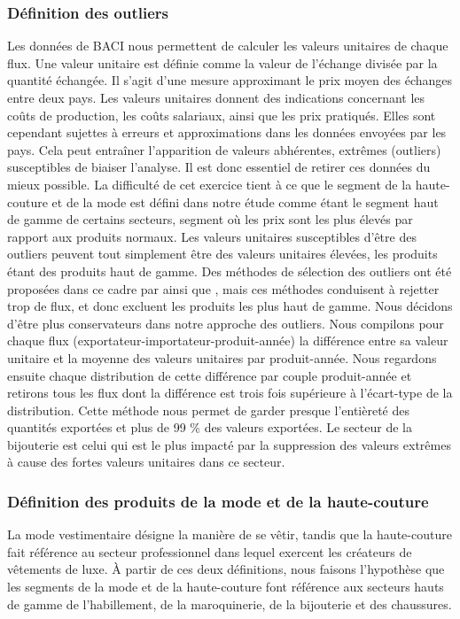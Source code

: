 \documentclass[french,10pt,a4paper]{article}
\begin{document}
\subsubsection*{Définition des outliers}
Les données de BACI nous permettent de calculer les valeurs unitaires de chaque flux. Une valeur unitaire est définie comme la valeur de l'échange divisée par la quantité échangée. Il s'agit d'une mesure approximant le prix moyen des échanges entre deux pays. Les valeurs unitaires donnent des indications concernant les coûts de production, les coûts salariaux, ainsi que les prix pratiqués. Elles sont cependant sujettes à erreurs et approximations dans les données envoyées par les pays. Cela peut entraîner l'apparition de valeurs abhérentes, extrêmes (outliers) susceptibles de biaiser l'analyse. Il est donc essentiel de retirer ces données du mieux possible. La difficulté de cet exercice tient à ce que le segment de la haute-couture et de la mode est défini dans notre étude comme étant le segment haut de gamme de certains secteurs, segment où les prix sont les plus élevés par rapport aux produits normaux. Les valeurs unitaires susceptibles d'être des outliers peuvent tout simplement être des valeurs unitaires élevées, les produits étant des produits haut de gamme. Des méthodes de sélection des outliers ont été proposées dans ce cadre par \cite{Hallak2006} ainsi que \cite{Fontagne2013}, mais ces méthodes conduisent à rejetter trop de flux, et donc excluent les produits les plus haut de gamme. Nous décidons d'être plus conservateurs dans notre approche des outliers. Nous compilons pour chaque flux (exportateur-importateur-produit-année) la différence entre sa valeur unitaire et la moyenne des valeurs unitaires par produit-année. Nous regardons ensuite chaque distribution de cette différence par couple produit-année et retirons tous les flux dont la différence est trois fois supérieure à l'écart-type de la distribution. Cette méthode nous permet de garder presque l'entièreté des quantités exportées et plus de 99 \% des valeurs exportées. Le secteur de la bijouterie est celui qui est le plus impacté par la suppression des valeurs extrêmes à cause des fortes valeurs unitaires dans ce secteur.

\subsubsection*{Définition des produits de la mode et de la haute-couture}
La mode vestimentaire désigne la manière de se vêtir, tandis que la haute-couture fait référence au secteur professionnel dans lequel exercent les créateurs de vêtements de luxe. À partir de ces deux définitions, nous faisons l'hypothèse que les segments de la mode et de la haute-couture font référence aux secteurs hauts de gamme de l'habillement, de la maroquinerie, de la bijouterie et des chaussures.
\end{document}
